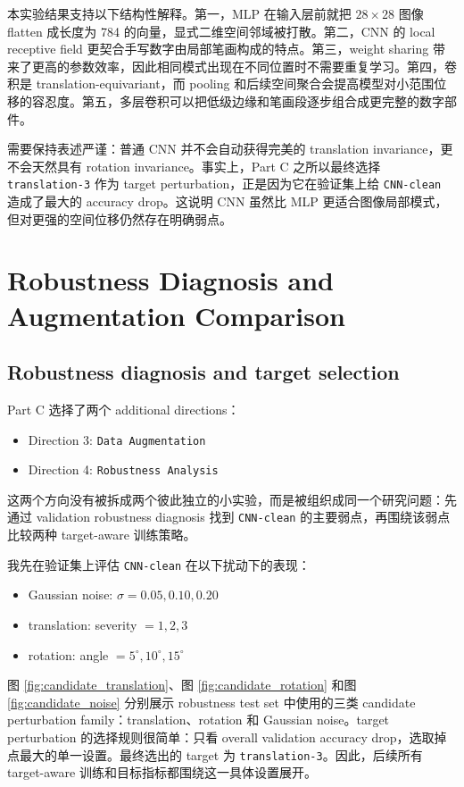 \documentclass[12pt,a4paper,fontset=fandol]{ctexart}
\begin{document}
本实验结果支持以下结构性解释。第一，MLP 在输入层前就把 $28 \times 28$ 图像 flatten 成长度为 784 的向量，显式二维空间邻域被打散。第二，CNN 的 local receptive field 更契合手写数字由局部笔画构成的特点。第三，weight sharing 带来了更高的参数效率，因此相同模式出现在不同位置时不需要重复学习。第四，卷积是 translation-equivariant，而 pooling 和后续空间聚合会提高模型对小范围位移的容忍度。第五，多层卷积可以把低级边缘和笔画段逐步组合成更完整的数字部件。

需要保持表述严谨：普通 CNN 并不会自动获得完美的 translation invariance，更不会天然具有 rotation invariance。事实上，Part C 之所以最终选择 \texttt{translation-3} 作为 target perturbation，正是因为它在验证集上给 \texttt{CNN-clean} 造成了最大的 accuracy drop。这说明 CNN 虽然比 MLP 更适合图像局部模式，但对更强的空间位移仍然存在明确弱点。

\section{Robustness Diagnosis and Augmentation Comparison}

\subsection{Robustness diagnosis and target selection}

Part C 选择了两个 additional directions：
\begin{itemize}
  \item Direction 3: \texttt{Data Augmentation}
  \item Direction 4: \texttt{Robustness Analysis}
\end{itemize}

这两个方向没有被拆成两个彼此独立的小实验，而是被组织成同一个研究问题：先通过 validation robustness diagnosis 找到 \texttt{CNN-clean} 的主要弱点，再围绕该弱点比较两种 target-aware 训练策略。

我先在验证集上评估 \texttt{CNN-clean} 在以下扰动下的表现：
\begin{itemize}
  \item Gaussian noise: $\sigma = 0.05, 0.10, 0.20$
  \item translation: severity $= 1, 2, 3$
  \item rotation: angle $= 5^\circ, 10^\circ, 15^\circ$
\end{itemize}

图 \ref{fig:candidate_translation}、图 \ref{fig:candidate_rotation} 和图 \ref{fig:candidate_noise} 分别展示 robustness test set 中使用的三类 candidate perturbation family：translation、rotation 和 Gaussian noise。target perturbation 的选择规则很简单：只看 overall validation accuracy drop，选取掉点最大的单一设置。最终选出的 target 为 \texttt{translation-3}。因此，后续所有 target-aware 训练和目标指标都围绕这一具体设置展开。
\end{document}
